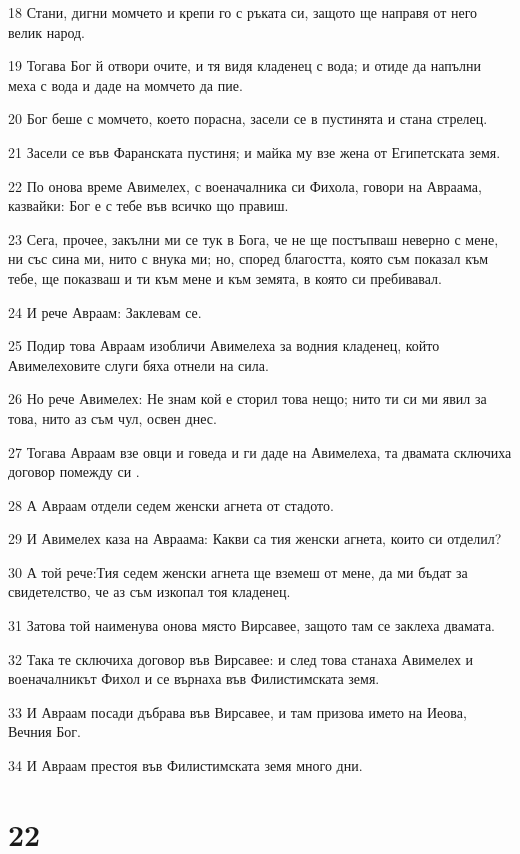 \par 18 Стани, дигни момчето и крепи го с ръката си, защото ще направя от него велик народ.
\par 19 Тогава Бог й отвори очите, и тя видя кладенец с вода; и отиде да напълни меха с вода и даде на момчето да пие.
\par 20 Бог беше с момчето, което порасна, засели се в пустинята и стана стрелец.
\par 21 Засели се във Фаранската пустиня; и майка му взе жена от Египетската земя.
\par 22 По онова време Авимелех, с военачалника си Фихола, говори на Авраама, казвайки: Бог е с тебе във всичко що правиш.
\par 23 Сега, прочее, закълни ми се тук в Бога, че не ще постъпваш неверно с мене, ни със сина ми, нито с внука ми; но, според благостта, която съм показал към тебе, ще показваш и ти към мене и към земята, в която си пребивавал.
\par 24 И рече Авраам: Заклевам се.
\par 25 Подир това Авраам изобличи Авимелеха за водния кладенец, който Авимелеховите слуги бяха отнели на сила.
\par 26 Но рече Авимелех: Не знам кой е сторил това нещо; нито ти си ми явил за това, нито аз съм чул, освен днес.
\par 27 Тогава Авраам взе овци и говеда и ги даде на Авимелеха, та двамата сключиха договор помежду си .
\par 28 А Авраам отдели седем женски агнета от стадото.
\par 29 И Авимелех каза на Авраама: Какви са тия женски агнета, които си отделил?
\par 30 А той рече:Тия седем женски агнета ще вземеш от мене, да ми бъдат за свидетелство, че аз съм изкопал тоя кладенец.
\par 31 Затова той наименува онова място Вирсавее, защото там се заклеха двамата.
\par 32 Така те сключиха договор във Вирсавее: и след това станаха Авимелех и военачалникът Фихол и се върнаха във Филистимската земя.
\par 33 И Авраам посади дъбрава във Вирсавее, и там призова името на Иеова, Вечния Бог.
\par 34 И Авраам престоя във Филистимската земя много дни.

\chapter{22}

